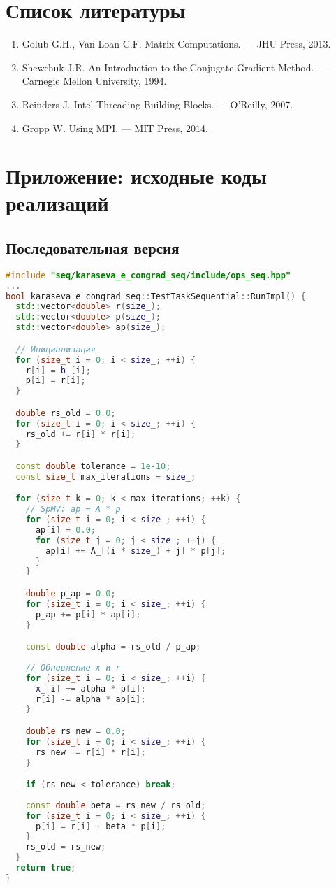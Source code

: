 \documentclass[12pt]{article}
\begin{document}
\section{Список литературы}
\begin{enumerate}
    \item Golub G.H., Van Loan C.F. Matrix Computations. — JHU Press, 2013.
    \item Shewchuk J.R. An Introduction to the Conjugate Gradient Method. — Carnegie Mellon University, 1994.
    \item Reinders J. Intel Threading Building Blocks. — O’Reilly, 2007.
    \item Gropp W. Using MPI. — MIT Press, 2014.
\end{enumerate}

\newpage
\appendix
\section{Приложение: исходные коды реализаций}

\subsection{Последовательная версия}
\begin{lstlisting}[language=C++]
#include "seq/karaseva_e_congrad_seq/include/ops_seq.hpp"
...
bool karaseva_e_congrad_seq::TestTaskSequential::RunImpl() {
  std::vector<double> r(size_);
  std::vector<double> p(size_);
  std::vector<double> ap(size_);

  // Инициализация
  for (size_t i = 0; i < size_; ++i) {
    r[i] = b_[i];
    p[i] = r[i];
  }

  double rs_old = 0.0;
  for (size_t i = 0; i < size_; ++i) {
    rs_old += r[i] * r[i];
  }

  const double tolerance = 1e-10;
  const size_t max_iterations = size_;

  for (size_t k = 0; k < max_iterations; ++k) {
    // SpMV: ap = A * p
    for (size_t i = 0; i < size_; ++i) {
      ap[i] = 0.0;
      for (size_t j = 0; j < size_; ++j) {
        ap[i] += A_[(i * size_) + j] * p[j];
      }
    }

    double p_ap = 0.0;
    for (size_t i = 0; i < size_; ++i) {
      p_ap += p[i] * ap[i];
    }

    const double alpha = rs_old / p_ap;
    
    // Обновление x и r
    for (size_t i = 0; i < size_; ++i) {
      x_[i] += alpha * p[i];
      r[i] -= alpha * ap[i];
    }

    double rs_new = 0.0;
    for (size_t i = 0; i < size_; ++i) {
      rs_new += r[i] * r[i];
    }

    if (rs_new < tolerance) break;
    
    const double beta = rs_new / rs_old;
    for (size_t i = 0; i < size_; ++i) {
      p[i] = r[i] + beta * p[i];
    }
    rs_old = rs_new;
  }
  return true;
}
\end{lstlisting}
\end{document}
